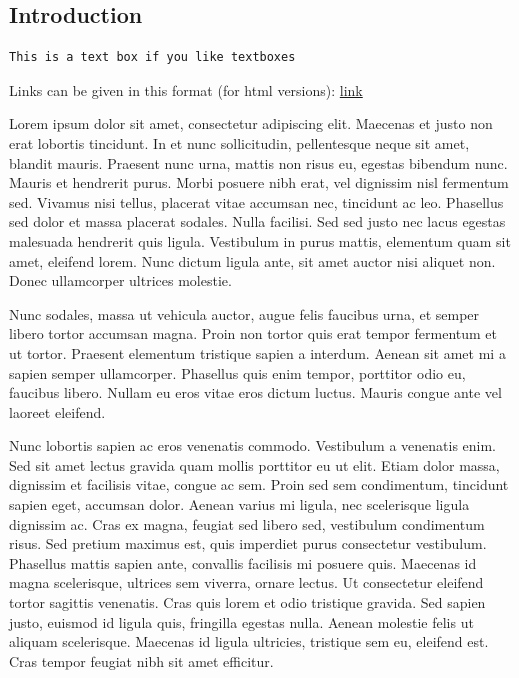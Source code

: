 \documentclass[
]{article}
\begin{document}
\newpage

\hypertarget{introduction}{%
\subsection{Introduction}\label{introduction}}

\begin{verbatim}
This is a text box if you like textboxes
\end{verbatim}

Links can be given in this format (for html versions):
\href{https://www.ncbi.nlm.nih.gov/pmc/articles/PMC6852019/}{link}

Lorem ipsum dolor sit amet, consectetur adipiscing elit. Maecenas et
justo non erat lobortis tincidunt. In et nunc sollicitudin, pellentesque
neque sit amet, blandit mauris. Praesent nunc urna, mattis non risus eu,
egestas bibendum nunc. Mauris et hendrerit purus. Morbi posuere nibh
erat, vel dignissim nisl fermentum sed. Vivamus nisi tellus, placerat
vitae accumsan nec, tincidunt ac leo. Phasellus sed dolor et massa
placerat sodales. Nulla facilisi. Sed sed justo nec lacus egestas
malesuada hendrerit quis ligula. Vestibulum in purus mattis, elementum
quam sit amet, eleifend lorem. Nunc dictum ligula ante, sit amet auctor
nisi aliquet non. Donec ullamcorper ultrices molestie.

Nunc sodales, massa ut vehicula auctor, augue felis faucibus urna, et
semper libero tortor accumsan magna. Proin non tortor quis erat tempor
fermentum et ut tortor. Praesent elementum tristique sapien a interdum.
Aenean sit amet mi a sapien semper ullamcorper. Phasellus quis enim
tempor, porttitor odio eu, faucibus libero. Nullam eu eros vitae eros
dictum luctus. Mauris congue ante vel laoreet eleifend.

Nunc lobortis sapien ac eros venenatis commodo. Vestibulum a venenatis
enim. Sed sit amet lectus gravida quam mollis porttitor eu ut elit.
Etiam dolor massa, dignissim et facilisis vitae, congue ac sem. Proin
sed sem condimentum, tincidunt sapien eget, accumsan dolor. Aenean
varius mi ligula, nec scelerisque ligula dignissim ac. Cras ex magna,
feugiat sed libero sed, vestibulum condimentum risus. Sed pretium
maximus est, quis imperdiet purus consectetur vestibulum. Phasellus
mattis sapien ante, convallis facilisis mi posuere quis. Maecenas id
magna scelerisque, ultrices sem viverra, ornare lectus. Ut consectetur
eleifend tortor sagittis venenatis. Cras quis lorem et odio tristique
gravida. Sed sapien justo, euismod id ligula quis, fringilla egestas
nulla. Aenean molestie felis ut aliquam scelerisque. Maecenas id ligula
ultricies, tristique sem eu, eleifend est. Cras tempor feugiat nibh sit
amet efficitur.
\end{document}
